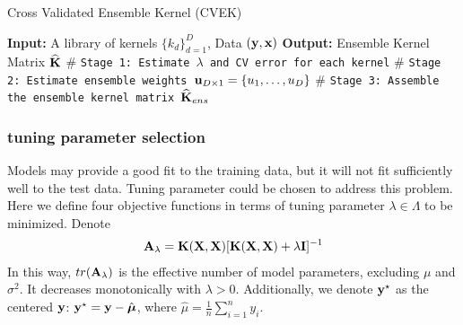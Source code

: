\documentclass[11pt]{article}
\begin{document}
\begin{algorithm}
\caption{Cross Validated Ensemble Kernel (CVEK)} 
\label{alg:cvke}
\begin{algorithmic}[1]
\newline
\textbf{Input:} A library of kernels $\{k_d\}_{d=1}^D$, Data $({\bf y}, {\bf x})$\newline
\textbf{Output:} Ensemble Kernel Matrix $\widehat{{\bf K}}$\newline
$\#$ \texttt{Stage 1: Estimate $\lambda$ and CV error for each kernel}
\EndFor 
\newline
$\#$ \texttt{Stage 2: Estimate ensemble weights ${\bf u}_{D \times 1} = \{u_1, \dots, u_D\}$}
\newline
$\#$ \texttt{Stage 3: Assemble the ensemble kernel matrix $\widehat{{\bf K}}_{ens}$}
\EndProcedure
\end{algorithmic}
\end{algorithm}

\subsubsection{{tuning parameter selection}}
Models may provide a good fit to the training data, but it will not fit sufficiently well to the test data. Tuning parameter could be chosen to address this problem. Here we define four objective functions in terms of tuning parameter $\lambda \in \Lambda$ to be minimized. Denote
\begin{align}
{\bf A}_\lambda={\bf K}({\bf X}, {\bf X})[{\bf K}({\bf X}, {\bf X})+\lambda {\bf I}]^{-1}
\end{align}
In this way, $tr({\bf A}_\lambda)$ is the effective number of model parameters, excluding $\mu$ and $\sigma^2$. It decreases monotonically with $\lambda>0$. Additionally, we denote ${\bf y}^\star$ as the centered ${\bf y}$: ${\bf y}^\star={\bf y}-\hat{\boldsymbol{\mu}}$, where $\hat{\mu}=\frac{1}{n}\sum_{i=1}^ny_i$.
\end{document}
